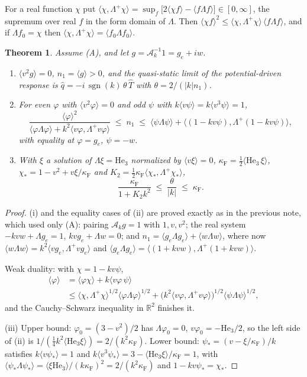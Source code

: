 \documentclass[11pt]{article}
\newcommand{\sgn}{\operatorname{sgn}}
\newcommand{\He}{\mathrm{He}}
\newcommand{\cA}{\mathcal{A}}
\newcommand{\avg}[1]{\langle #1\rangle}
\newtheorem{theorem}{Theorem}
\theoremstyle{remark}
\begin{document}
For a real function $\chi$ put
$\avg{\chi,\Lambda^+\chi} = \sup_f\bigl[2\avg{\chi f}-\avg{f\Lambda f}\bigr]
\in[0,\infty]$, the supremum over real $f$ in the form domain of $\Lambda$.
Then $\avg{\chi f}^2\le\avg{\chi,\Lambda^+\chi}\,\avg{f\Lambda f}$, and if
$\Lambda f_0=\chi$ then $\avg{\chi,\Lambda^+\chi} = \avg{f_0\Lambda f_0}$.

\begin{theorem}\label{thm:abs}
Assume (A), and let $g = \cA_k^{-1}1 = g_e+iw$.
\begin{enumerate}
  \item[(i)] $\avg{v^2g}=0$, $n_1=\avg{g}>0$, and the quasi-static limit of
    the potential-driven response is
    $\hat q = -i\,\sgn(k)\,\theta\,\hat T$ with $\theta = 2/(|k|n_1)$.
  \item[(ii)] For even $\varphi$ with $\avg{v^2\varphi}=0$ and odd $\psi$
    with $k\avg{v\psi}=k\avg{v^3\psi}=1$,
    \[
      \frac{\avg{\varphi}^2}
           {\avg{\varphi\Lambda\varphi}+k^2\avg{v\varphi,\Lambda^+v\varphi}}
      \;\le\; n_1 \;\le\;
      \avg{\psi\Lambda\psi}+\avg{(1-kv\psi),\Lambda^+(1-kv\psi)},
    \]
    with equality at $\varphi=g_e$, $\psi=-w$.
  \item[(iii)] With $\xi$ a solution of $\Lambda\xi=\He_3$ normalized by
    $\avg{v\xi}=0$,
    $\kappa_{\mathrm F} = \tfrac12\avg{\He_3\,\xi}$,
    $\chi_* = 1-v^2+v\xi/\kappa_{\mathrm F}$ and
    $K_2 = \tfrac12\kappa_{\mathrm F}\avg{\chi_*,\Lambda^+\chi_*}$,
    \[
      \frac{\kappa_{\mathrm F}}{1+K_2k^2}\;\le\;\frac{\theta}{|k|}
      \;\le\;\kappa_{\mathrm F}.
    \]
\end{enumerate}
\end{theorem}

\begin{proof}
(i) and the equality cases of (ii) are proved exactly as in the previous
note, which used only (A): pairing $\cA_kg=1$ with $1,v,v^2$; the real system
$-kvw+\Lambda g_e=1$, $kvg_e+\Lambda w=0$; and
$n_1=\avg{g_e\Lambda g_e}+\avg{w\Lambda w}$, where now
$\avg{w\Lambda w} = k^2\avg{vg_e,\Lambda^+vg_e}$ and
$\avg{g_e\Lambda g_e} = \avg{(1+kvw),\Lambda^+(1+kvw)}$.

Weak duality: with $\chi=1-kv\psi$,
\begin{align*}
  \avg{\varphi} &= \avg{\varphi\chi}+k\avg{v\varphi\,\psi} \\
  &\le\avg{\chi,\Lambda^+\chi}^{1/2}\avg{\varphi\Lambda\varphi}^{1/2}
  + \bigl(k^2\avg{v\varphi,\Lambda^+v\varphi}\bigr)^{1/2}
    \avg{\psi\Lambda\psi}^{1/2},
\end{align*}
and the Cauchy--Schwarz inequality in $\mathbb{R}^2$ finishes it.

(iii) Upper bound: $\varphi_0=(3-v^2)/2$ has $\Lambda\varphi_0=0$,
$v\varphi_0=-\He_3/2$, so the left side of (ii) is
$1/(\tfrac14k^2\avg{\He_3\xi}) = 2/(k^2\kappa_{\mathrm F})$. Lower bound:
$\psi_*=(v-\xi/\kappa_{\mathrm F})/k$ satisfies $k\avg{v\psi_*}=1$ and
$k\avg{v^3\psi_*} = 3-\avg{\He_3\xi}/\kappa_{\mathrm F}=1$, with
$\avg{\psi_*\Lambda\psi_*} = \avg{\xi\He_3}/(k\kappa_{\mathrm F})^2
= 2/(k^2\kappa_{\mathrm F})$ and $1-kv\psi_*=\chi_*$.
\end{proof}
\end{document}
